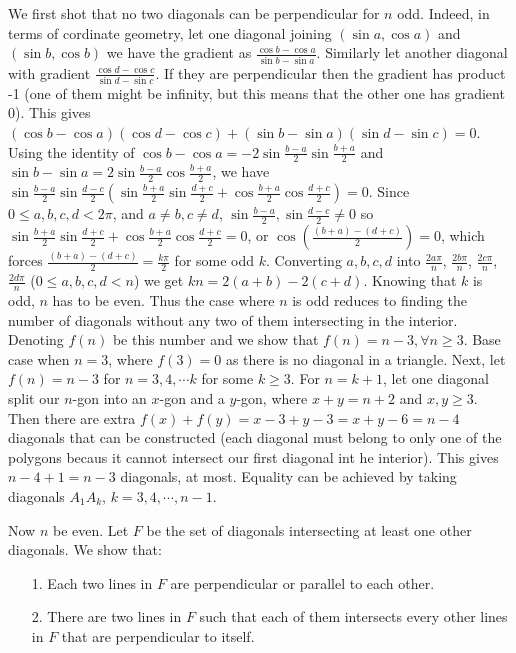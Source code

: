 \documentclass[11pt,a4paper]{article}
\begin{document}
\begin{itemize}
We first shot that no two diagonals can be perpendicular for $n$ odd. 
Indeed, in terms of cordinate geometry, let one diagonal joining $(\sin a, \cos a)$ and $(\sin b, \cos b)$ we have the gradient as 
$\frac{\cos b-\cos a}{\sin b-\sin a}$. 
Similarly let another diagonal with gradient 
$\frac{\cos d-\cos c}{\sin d-\sin c}$. 
If they are perpendicular then the gradient has product -1 (one of them might be infinity, but this means that the other one has gradient 0). 
This gives $(\cos b-\cos a)(\cos d-\cos c)+(\sin b-\sin a)(\sin d-\sin c)=0$. 
Using the identity of $\cos b-\cos a=-2\sin\frac{b-a}{2}\sin\frac{b+a}{2}$ and 
$\sin b-\sin a=2\sin\frac{b-a}{2}\cos\frac{b+a}{2}$, we have 
$\sin\frac{b-a}{2}\sin\frac{d-c}{2}(\sin\frac{b+a}{2}\sin\frac{d+c}{2}+\cos\frac{b+a}{2}\cos\frac{d+c}{2})=0$. 
Since $0\le a,b,c,d<2\pi$, and $a\neq b, c\neq d$, 
$\sin\frac{b-a}{2}, \sin\frac{d-c}{2}\neq 0$ so 
$\sin\frac{b+a}{2}\sin\frac{d+c}{2}+\cos\frac{b+a}{2}\cos\frac{d+c}{2}=0$, or 
$\cos (\frac{(b+a)-(d+c)}2)=0$, which forces 
$\frac{(b+a)-(d+c)}2=\frac{k\pi}2$ for some odd $k$. 
Converting $a, b, c, d$ into $\frac{2a\pi}{n}$, $\frac{2b\pi}{n}$, $\frac{2c\pi}{n}$, $\frac{2d\pi}{n}$ ($0\le a, b, c, d < n$) we get 
$kn=2(a+b)-2(c+d)$. 
Knowing that $k$ is odd, $n$ has to be even. 
Thus the case where $n$ is odd reduces to finding the number of diagonals without any two of them intersecting in the interior. 
Denoting $f(n)$ be this number and we show that $f(n)=n-3, \forall n\ge 3$. 
Base case when $n=3$, where $f(3)=0$ as there is no diagonal in a triangle. 
Next, let $f(n)=n-3$ for $n=3, 4, \cdots k$ for some $k\ge 3$. 
For $n=k+1$, let one diagonal split our $n$-gon into an $x$-gon and a $y$-gon, where $x+y=n+2$ and $x, y\ge 3$. 
Then there are extra $f(x)+f(y)=x-3+y-3=x+y-6=n-4$ diagonals that can be constructed (each diagonal must belong to only one of the polygons becaus it cannot intersect our first diagonal int he interior). 
This gives $n-4+1=n-3$ diagonals, at most. 
Equality can be achieved by taking diagonals $A_1A_k$, $k=3, 4, \cdots , n-1$.

Now $n$ be even. Let $F$ be the set of diagonals intersecting at least one other diagonals. We show that: 
\begin{itemize}
\item [1.]
Each two lines in $F$ are perpendicular or parallel to each other. 

\item [2.]
There are two lines in $F$ such that each of them intersects every other lines in $F$ that are perpendicular to itself.


\end{itemize}
\end{itemize}
\end{document}
